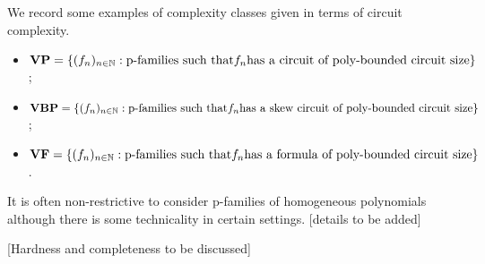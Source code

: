We record some examples of complexity classes given in terms of circuit complexity.
\begin{itemize}
 \item $\mathbf{VP} = \{ (f_n) _{n \in \mathbb{N}} : \text{p-families such that} f_n \text{has a circuit of poly-bounded circuit size}\}$;
 \item $\mathbf{VBP} = \{ (f_n) _{n \in \mathbb{N}} : \text{p-families such that} f_n \text{has a skew circuit of poly-bounded circuit size}\}$;
 \item $\mathbf{VF} = \{ (f_n) _{n \in \mathbb{N}} : \text{p-families such that} f_n \text{has a formula of poly-bounded circuit size}\}$.
\end{itemize}
It is often non-restrictive to consider p-families of homogeneous polynomials although there is some technicality in certain settings. [details to be added]

[Hardness and completeness to be discussed]


